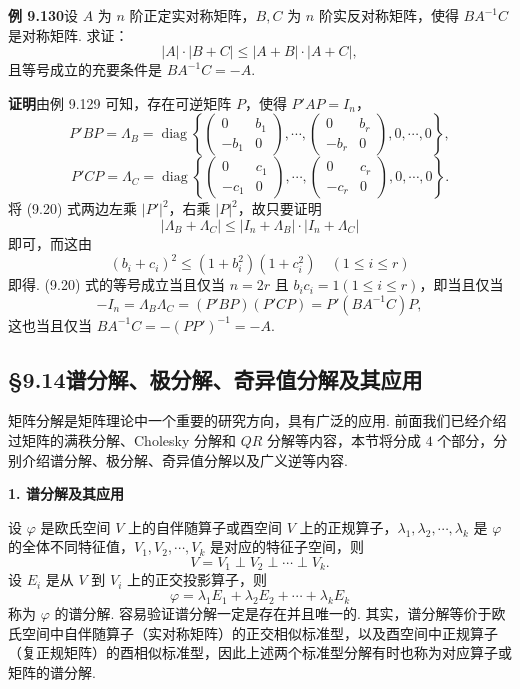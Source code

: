 \documentclass[UTF8,12pt,a4paper,fontset=fandol]{ctexart}
\begin{document}
\noindent\textbf{例 9.130}\quad 设 $A$ 为 $n$ 阶正定实对称矩阵，$B,C$ 为 $n$ 阶实反对称矩阵，使得 $BA^{-1}C$ 是对称矩阵. 求证：
\begin{equation}
|A|\cdot|B+C|\le |A+B|\cdot|A+C|,
\tag{9.20}
\end{equation}
且等号成立的充要条件是 $BA^{-1}C=-A$.

\noindent\textbf{证明}\quad 由例 9.129 可知，存在可逆矩阵 $P$，使得 $P'AP=I_n$，
\[
P'BP=\Lambda_B=\operatorname{diag}\left\{
\begin{pmatrix}
0&b_1\\
-b_1&0
\end{pmatrix},\cdots,
\begin{pmatrix}
0&b_r\\
-b_r&0
\end{pmatrix},
0,\cdots,0
\right\},
\]
\[
P'CP=\Lambda_C=\operatorname{diag}\left\{
\begin{pmatrix}
0&c_1\\
-c_1&0
\end{pmatrix},\cdots,
\begin{pmatrix}
0&c_r\\
-c_r&0
\end{pmatrix},
0,\cdots,0
\right\}.
\]
将 (9.20) 式两边左乘 $|P'|^2$，右乘 $|P|^2$，故只要证明
\[
|\Lambda_B+\Lambda_C|\le |I_n+\Lambda_B|\cdot|I_n+\Lambda_C|
\]
即可，而这由
\[
(b_i+c_i)^2\le(1+b_i^2)(1+c_i^2)\quad (1\le i\le r)
\]
即得. (9.20) 式的等号成立当且仅当 $n=2r$ 且 $b_ic_i=1(1\le i\le r)$，即当且仅当
\[
-I_n=\Lambda_B\Lambda_C=(P'BP)(P'CP)=P'(BA^{-1}C)P,
\]
这也当且仅当 $BA^{-1}C=-(PP')^{-1}=-A$.

\subsection*{§9.14\quad 谱分解、极分解、奇异值分解及其应用}

矩阵分解是矩阵理论中一个重要的研究方向，具有广泛的应用. 前面我们已经介绍过矩阵的满秩分解、Cholesky 分解和 $QR$ 分解等内容，本节将分成 $4$ 个部分，分别介绍谱分解、极分解、奇异值分解以及广义逆等内容.

\noindent\textbf{1. 谱分解及其应用}

设 $\varphi$ 是欧氏空间 $V$ 上的自伴随算子或酉空间 $V$ 上的正规算子，$\lambda_1,\lambda_2,\cdots,\lambda_k$ 是 $\varphi$ 的全体不同特征值，$V_1,V_2,\cdots,V_k$ 是对应的特征子空间，则
\begin{equation}
V=V_1\perp V_2\perp\cdots\perp V_k.
\tag{9.21}
\end{equation}
设 $E_i$ 是从 $V$ 到 $V_i$ 上的正交投影算子，则
\[
\varphi=\lambda_1E_1+\lambda_2E_2+\cdots+\lambda_kE_k
\]
称为 $\varphi$ 的谱分解. 容易验证谱分解一定是存在并且唯一的. 其实，谱分解等价于欧氏空间中自伴随算子（实对称矩阵）的正交相似标准型，以及酉空间中正规算子（复正规矩阵）的酉相似标准型，因此上述两个标准型分解有时也称为对应算子或矩阵的谱分解.
\end{document}
